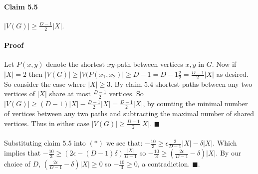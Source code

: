 \documentclass[letterpaper,12pt,oneside,onecolumn]{report}
\begin{document}
\paragraph{Claim 5.5}
$|V(G)| \geq \frac{D-1}{2}|X|$.
\paragraph{Proof}
Let $P(x,y)$ denote the shortest $xy$-path between vertices $x,y$ in $G$.  Now if $|X| = 2$ then $|V(G)| \geq |V(P(x_1,x_2)| \geq D-1 = D-1\frac{2}{2} = \frac{D-1}{2}|X|$ as desired. So consider the case where $|X| \geq 3$. By claim $5.4$ shortest paths between any two vertices of $|X|$ share at most $\frac{D-1}{2}$ vertices. So $|V(G)| \geq (D-1)|X| - \frac{D-1}{2}|X| = \frac{D-1}{2}|X|$, by counting the minimal number of vertices between any two paths and subtracting the maximal number of shared vertices. Thus in either case $|V(G)| \geq \frac{D-1}{2}|X|$. $\blacksquare$
\paragraph{}
Substituting claim $5.5$ into $(*)$ we see that: $-\frac{10}{3} \geq \epsilon \frac{2}{D-1}|X| - \delta|X|$. Which implies that $-\frac{10}{3} \geq (2\epsilon - (D-1)\delta )\frac{|X|}{D-1}$ so $-\frac{10}{3} \geq (\frac{2\epsilon}{D-1} - \delta)|X|$. By our choice of $D$, $(\frac{2\epsilon}{D-1} -\delta)|X| \geq 0$ so $-\frac{10}{3} \geq 0$, a contradiction. $\blacksquare$.
\end{document}
